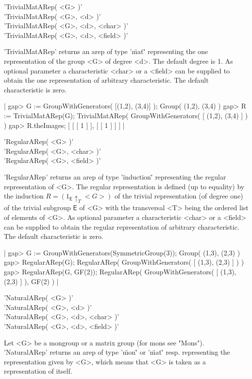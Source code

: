 'TrivialMatARep( <G> )'\\
'TrivialMatARep( <G>, <d> )'\\
'TrivialMatARep( <G>, <d>, <char> )'\\
'TrivialMatARep( <G>, <d>, <field> )'

'TrivialMatARep' returns an arep of type '\"mat\"' representing 
the one representation of the group <G> of degree <d>. The default
degree is 1.
As optional parameter a characteristic <char> or a <field> 
can be supplied to obtain the one representation of arbitrary 
characteristic. The default characteristic is zero.

|    gap> G := GroupWithGenerators( [(1,2), (3,4)] );
    Group( (1,2), (3,4) )
    gap> R := TrivialMatARep(G);   
    TrivialMatARep( GroupWithGenerators( [ (1,2), (3,4) ] ) )
    gap> R.theImages;
    [ [ [ 1 ] ], [ [ 1 ] ] ] |


'RegularARep( <G> )'\\
'RegularARep( <G>, <char> )'\\
'RegularARep( <G>, <field> )'

'RegularARep' returns an arep of type '\"induction\"' representing
the regular representation of <G>. The regular representation is 
defined (up to equality) by the induction 
$R = (1_{\mathsf{E}}\uparrow_T <G>)$ of the trivial representation
(of degree one) of the trivial subgroup $\mathsf{E}$ of <G> with 
the transversal <T> being the ordered list of elements of <G>.
As optional parameter a characteristic <char> or a <field> 
can be supplied to obtain the regular representation of arbitrary 
characteristic. The default characteristic is zero.

|    gap> G := GroupWithGenerators(SymmetricGroup(3));
    Group( (1,3), (2,3) )
    gap> RegularARep(G);
    RegularARep( GroupWithGenerators( [ (1,3), (2,3) ] ) )
    gap> RegularARep(G, GF(2));
    RegularARep( GroupWithGenerators( [ (1,3), (2,3) ] ), GF(2) ) |


'NaturalARep( <G> )'\\
'NaturalARep( <G>, <d> )'\\
'NaturalARep( <G>, <d>, <char> )'\\
'NaturalARep( <G>, <d>, <field> )'

Let <G> be a mongroup or a matrix group (for mons see "Mons"). 
'NaturalARep' returns an arep of type '\"mon\"' or '\"mat\"' resp. 
representing the representation given by <G>, 
which means that <G> is taken as a representation of itself.

